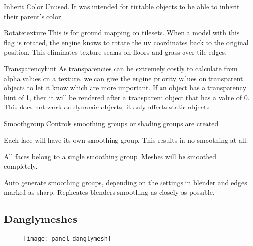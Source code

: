 \begin{propertyAurora}{Inherit Color}
Unused. It was intended for tintable 
objects to be able to inherit their parent's color.
\end{propertyAurora}

\begin{propertyAurora}{Rotatetexture}
This is for ground mapping on tilesets. When a model with
this flag is rotated, the engine knows to rotate the uv coordinates back 
to the original position. This eliminates texture seams on floors 
and grass over tile edges.
\end{propertyAurora}

\begin{propertyAurora}{Transparencyhint}
As transparencies can be extremely costly to calculate from alpha values on a
texture, we can give the engine priority values on transparent objects to let it
know which are more important. If an object has a transparency hint of 1, then it
will be rendered after a transparent object that has a value of 0. This does not work 
on dynamic objects, it only affects static objects.
\end{propertyAurora}

\begin{propertyAurora}{Smoothgroup}
Controls smoothing groups or shading groups are created
\begin{description}[leftmargin=6em,style=nextline]
    \item[Separate] Each face will have its own smoothing group. This results in no smoothing at all.
    \item[Single] All faces belong to a single smoothing group. Meshes will be smoothed completely.
    \item[Auto] Auto generate smoothing groups, depending on the settings in blender and edges marked as sharp. Replicates blenders smoothing as closely as possible.
\end{description}
\end{propertyAurora}

\subsection{Danglymeshes}

\begin{figure}
    \centering
    \texttt{[image: panel\_danglymesh]}
    \label{fig:panel_danglymesh}
\end{figure}

